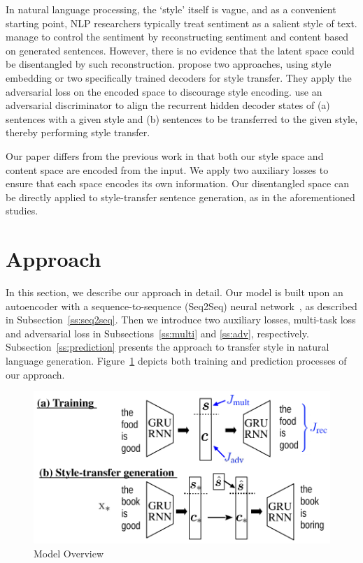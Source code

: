 \documentclass[11pt,a4paper]{article}
\begin{document}
In natural language processing, the `style' itself is vague, and as a convenient starting point, NLP researchers typically treat sentiment as a salient style of text.  manage to control the sentiment by reconstructing sentiment and content based on generated sentences. However, there is no evidence that the latent space could be disentangled by such reconstruction.  propose two approaches, using style embedding or two specifically trained decoders for style transfer. They apply the adversarial loss on the encoded space to discourage style encoding.  use an adversarial discriminator to align the recurrent hidden decoder states of (a) sentences with a given style and (b) sentences to be transferred to the given style, thereby performing style transfer.

Our paper differs from the previous work in that both our style space and content space are encoded from the input. We apply two auxiliary losses to ensure that each space encodes its own information. Our disentangled space can be directly applied to style-transfer sentence generation, as in the aforementioned studies.

\section{Approach}

In this section, we describe our approach in detail. Our model is built upon an autoencoder with a sequence-to-sequence (Seq2Seq) neural network~\cite{sutskever2014sequence}, as described in Subsection~\ref{ss:seq2seq}. Then we introduce two auxiliary losses, multi-task loss and adversarial loss in Subsections~\ref{ss:multi} and \ref{ss:adv}, respectively. Subsection~\ref{ss:prediction} presents the approach to transfer style in natural language generation. Figure~\ref{fig:model-overview} depicts both training and prediction processes of our approach.


\begin{figure}[ht]
	\centering
	\includegraphics[width=0.9\linewidth]{model-overview}
	\caption{Model Overview}
	\label{fig:model-overview}
\end{figure}
\end{document}
